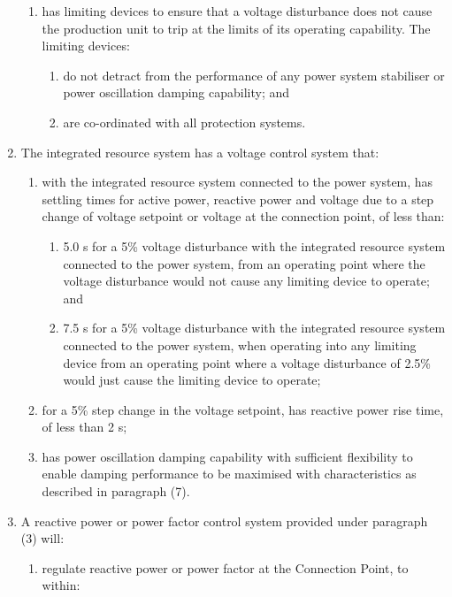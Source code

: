 \begin{enumerate}
\begin{enumerate}
		\item has limiting devices to ensure that a voltage disturbance does not cause the production unit to trip at the limits of its operating capability.  The limiting devices:
			\begin{enumerate}
				\item do not detract from the performance of any power system stabiliser or power oscillation damping capability;  and
				\item are co-ordinated with all protection systems.
			\end{enumerate}
		
	\end{enumerate}
	\item The integrated resource system has a voltage control system that: 
	\begin{enumerate}
		\item with the integrated resource system connected to the power system, has settling times for active power, reactive power and voltage due to a step change of voltage setpoint or voltage at the connection point, of less than:
		\begin{enumerate}
			\item 5.0 s for a 5\% voltage disturbance with the integrated resource system connected to the power system, from an operating point where the voltage disturbance would not cause any limiting device to operate; and
			\item 7.5 s for a 5\% voltage disturbance with the integrated resource system connected to the power system, when operating into any limiting device from an operating point where a voltage disturbance of 2.5\% would just cause the limiting device to operate;
		\end{enumerate}
		\item for a 5\% step change in the voltage setpoint, has reactive power rise time, of less than 2 s;
		\item has power oscillation damping capability with sufficient flexibility to enable damping performance to be maximised with characteristics as described in paragraph (7).
	\end{enumerate}
	\item A reactive power or power factor control system provided under paragraph (3) will: 
	\begin{enumerate}
		\item regulate reactive power or power factor at the Connection Point, to within: 
		\begin{enumerate}

\end{enumerate}
\end{enumerate}
\end{enumerate}
